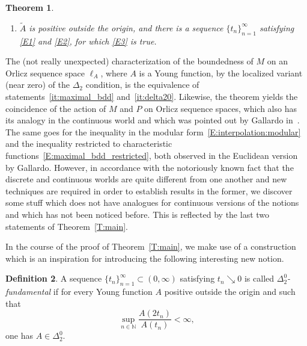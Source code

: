 \documentclass[nointlimits]{amsart}
\numberwithin{equation}{section}
\theoremstyle{plain}
\newtheorem{theorem}{Theorem}[section]
\theoremstyle{definition}
\newtheorem{definition}[theorem]{Definition}
\newcommand{\N}{\mathbb{N}}
\newcommand{\DTwo}{\Delta_2}
\newcommand{\DTwoZ}{\DTwo^0}
\newcommand{\tA}{\tilde{A}}
\begin{document}
\begin{theorem}
\begin{enumerate}[(1)]
\begin{equation}
    \end{equation}
    and
    \begin{equation}\label{E2}
        \limsup_{n\to\infty} \frac{t_n}{t_{n+1}} \leq 2,
    \end{equation}
    we have
    \begin{equation}\label{E3}
        \sup_{n\in\N} \frac{\tA(2t_n)}{\tA(t_n)} < \infty.
    \end{equation}
     \item\label{it:one_fund_seq} $\tA$ is positive outside the origin, and there is a sequence $\{t_n\}_{n=1}^\infty$ satisfying \eqref{E1} and \eqref{E2},
    for which \eqref{E3} is true.
\end{enumerate}
\end{theorem}

The (not really unexpected) characterization of the boundedness of $M$ on an Orlicz sequence space $\ell_{A}$, where $A$ is a Young function, by the localized variant (near zero) of the $\Delta_2$ condition, is the equivalence of statements~\ref{it:maximal_bdd} and~\ref{it:delta20}. Likewise, the theorem yields the coincidence of the action of $M$ and $P$ on Orlicz sequence spaces, which also has its analogy in the continuous world and which was pointed out by Gallardo in~\cite{Gal:88}. The same goes for the inequality in the modular form~\eqref{E:interpolation:modular} and the inequality restricted to characteristic functions~\eqref{E:maximal_bdd_restricted}, both observed in the Euclidean version by Gallardo. However, in accordance with the notoriously known fact that the discrete and continuous worlds are quite different from one another and new techniques are required in order to establish results in the former, we discover some stuff which does not have analogues for continuous versions of the notions and which has not been noticed before. This is reflected by the last two  statements of Theorem~\ref{T:main}.

In the course of the proof of Theorem~\ref{T:main}, we make use of a construction which is an inspiration for introducing the following interesting new notion.

\begin{definition}
    A sequence  $\{t_n\}_{n=1}^\infty\subset (0,\infty)$ satisfying $t_n\searrow 0$ is called \emph{$\DTwoZ$-fundamental} if for every Young function $A$ positive outside the origin and such that
    \begin{equation*}
        \sup_{n\in\N} \frac{A(2t_n)}{A(t_n)} < \infty,
    \end{equation*}
    one has $A\in\DTwoZ$.
\end{definition}
\end{document}
